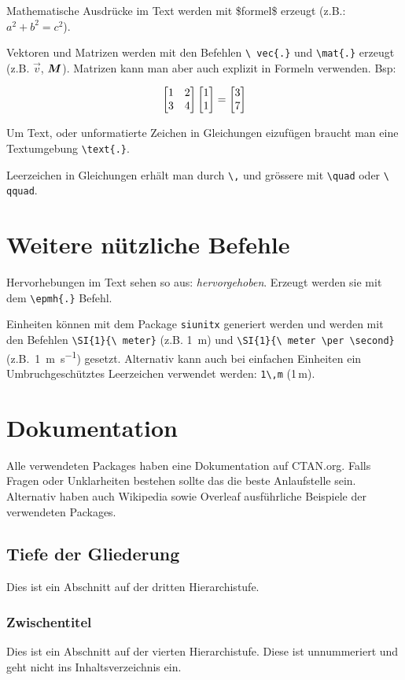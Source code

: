 Mathematische Ausdrücke im Text werden mit \$formel\$ erzeugt (z.B.:
$a^2+b^2=c^2$).

Vektoren und Matrizen werden mit den Befehlen \texttt{\textbackslash 
vec\{.\}} und \texttt{\textbackslash mat\{.\}} erzeugt 
(z.B. $\vec{v}$, $\mat{M}$). Matrizen kann man aber auch explizit in 
Formeln verwenden. Bsp:

\begin{equation}
    \begin{bmatrix}
    1 & 2 \\
    3 & 4 
    \end{bmatrix}
    \begin{bmatrix}
    1 \\
    1
    \end{bmatrix}
    = 
    \begin{bmatrix}
    3 \\
    7
    \end{bmatrix}
    \vspace{0.5cm}
\end{equation}

Um Text, oder unformatierte Zeichen in Gleichungen eizufügen braucht 
man eine Textumgebung \texttt{\textbackslash text\{.\}}.

Leerzeichen in Gleichungen erhält man durch \texttt{\textbackslash,} 
und grössere mit \texttt{\textbackslash quad} oder \texttt{\textbackslash 
qquad}.


\section{Weitere nützliche Befehle}\label{sec:div}

Hervorhebungen im Text sehen so aus: \emph{hervorgehoben}. Erzeugt
werden sie mit dem \texttt{\textbackslash epmh\{.\}} Befehl.

Einheiten können mit dem Package \texttt{siunitx} generiert werden 
und werden mit den Befehlen \texttt{\textbackslash SI\{1\}\{\textbackslash 
meter\}} (z.B. \SI{1}{\meter}) und \texttt{\textbackslash SI\{1\}\{\textbackslash 
meter \textbackslash per \textbackslash second\}} 
(z.B.~\SI{1}{\meter\per\second}) gesetzt. Alternativ kann auch bei
 einfachen Einheiten ein Umbruchgeschütztes Leerzeichen verwendet werden: 
 \texttt{1\textbackslash ,m} (1\,m).

\section{Dokumentation}
Alle verwendeten Packages haben eine Dokumentation auf CTAN.org. 
Falls Fragen oder Unklarheiten bestehen sollte das die beste 
Anlaufstelle sein. Alternativ haben auch Wikipedia sowie Overleaf 
ausführliche Beispiele der verwendeten Packages.

\subsection{Tiefe der Gliederung}
Dies ist ein Abschnitt auf der dritten Hierarchistufe.

\subsubsection{Zwischentitel}
Dies ist ein Abschnitt auf der vierten Hierarchistufe. 
Diese ist unnummeriert und geht nicht ins Inhaltsverzeichnis ein.